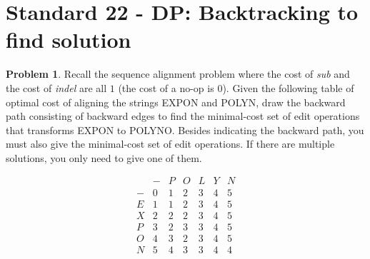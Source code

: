 \documentclass[11pt]{article}
\theoremstyle{definition}
\theoremstyle{definition}
\newtheorem{required}{Problem}
\theoremstyle{definition}
\begin{document}
\newpage
\section{Standard 22 - DP: Backtracking to find solution}

\begin{required} \label{Problem2}
Recall the sequence alignment problem where the cost of {\em sub} and the cost of {\em indel} are all $1$ (the cost of a no-op is 0). Given the following table of optimal cost of aligning the strings EXPON and POLYN, draw the backward path consisting of backward edges to find the minimal-cost set of edit operations that transforms EXPON to POLYNO. Besides indicating the backward path, you must also give the minimal-cost set of edit operations. If there are multiple solutions, you only need to give one of them. 

\[
\begin{array}{c|ccccccc}
   & - & P & O & L & Y & N \\ \hline
 - & 0 & 1 & 2 & 3 & 4 & 5   \\
E & 1 & 1 & 2 & 3 & 4 & 5  \\
X & 2 & 2 & 2 & 3 & 4 & 5  \\
P & 3 & 2 & 3 & 3 & 4 & 5  \\
O & 4 & 3 & 2 & 3 & 4 & 5  \\
N & 5 & 4 & 3 & 3 & 4 & 4 
\end{array}
\]

\end{required}
\end{document}
